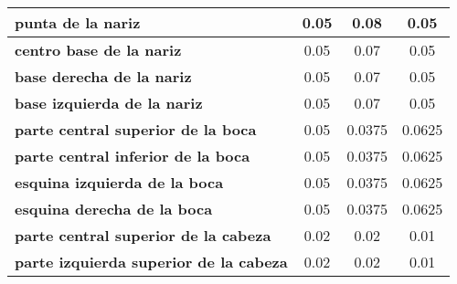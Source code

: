 \begin{table}[h]
{\begin{tabular}{|l|c|c|c|}
\textbf{punta de la nariz}                     & 0.05                                      & 0.08                                     & 0.05                                                                         \\ \hline
\textbf{centro base de la nariz}               & 0.05                                      & 0.07                                     & 0.05                                                                         \\ \hline
\textbf{base derecha de la nariz}              & 0.05                                      & 0.07                                     & 0.05                                                                         \\ \hline
\textbf{base izquierda de la nariz}            & 0.05                                      & 0.07                                     & 0.05                                                                         \\ \hline
\textbf{parte central superior de la boca}     & 0.05                                      & 0.0375                                   & 0.0625                                                                       \\ \hline
\textbf{parte central inferior de la boca}     & 0.05                                      & 0.0375                                   & 0.0625                                                                       \\ \hline
\textbf{esquina izquierda de la boca}          & 0.05                                      & 0.0375                                   & 0.0625                                                                       \\ \hline
\textbf{esquina derecha de la boca}            & 0.05                                      & 0.0375                                   & 0.0625                                                                       \\ \hline
\textbf{parte central superior de la cabeza}   & 0.02                                      & 0.02                                     & 0.01                                                                         \\ \hline
\textbf{parte izquierda superior de la cabeza} & 0.02                                      & 0.02                                     & 0.01                                                                         \\ \hline

\end{tabular}}
\end{table}
